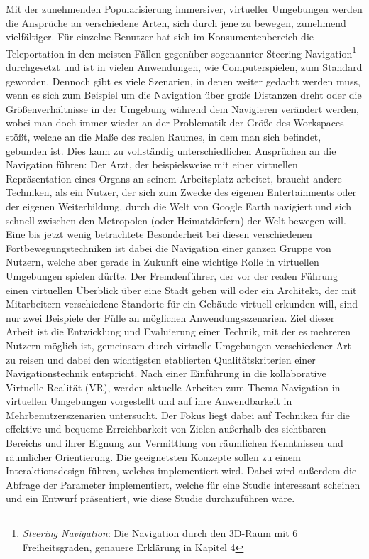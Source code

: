 Mit der zunehmenden Popularisierung immersiver, virtueller Umgebungen werden die Ansprüche an verschiedene Arten, sich durch jene zu bewegen, zunehmend vielfältiger.
Für einzelne Benutzer hat sich im Konsumentenbereich die Teleportation in den meisten Fällen gegenüber sogenannter \glqq Steering Navigation\grqq{}\footnote{\textit{Steering Navigation}: Die Navigation durch den 3D-Raum mit 6 Freiheitsgraden, genauere Erklärung in Kapitel 4} durchgesetzt und ist in vielen Anwendungen, wie Computerspielen, zum Standard geworden. 
Dennoch gibt es viele Szenarien, in denen weiter gedacht werden muss, wenn es sich zum Beispiel um die Navigation über große Distanzen dreht oder die Größenverhältnisse in der Umgebung während dem Navigieren verändert werden, wobei man doch immer wieder an der Problematik der Größe des Workspaces stößt, welche an die Maße des realen Raumes, in dem man sich befindet, gebunden ist.
Dies kann zu vollständig unterschiedlichen Ansprüchen an die Navigation führen: Der Arzt, der  beispielsweise mit einer virtuellen Repräsentation eines Organs an seinem Arbeitsplatz arbeitet, braucht andere Techniken, als ein Nutzer, der sich zum Zwecke des eigenen Entertainments oder der eigenen Weiterbildung, durch die Welt von Google Earth navigiert und sich schnell zwischen den Metropolen (oder Heimatdörfern) der Welt bewegen will. Eine bis jetzt wenig betrachtete Besonderheit bei diesen verschiedenen Fortbewegungstechniken ist dabei die Navigation einer ganzen Gruppe von Nutzern, welche aber gerade in Zukunft eine wichtige Rolle in virtuellen Umgebungen spielen dürfte. Der Fremdenführer, der vor der \glqq realen\grqq{} Führung einen virtuellen Überblick über eine Stadt geben will oder ein Architekt, der mit Mitarbeitern verschiedene Standorte für ein Gebäude virtuell erkunden will, sind nur zwei Beispiele der Fülle an möglichen Anwendungsszenarien.
Ziel dieser Arbeit ist die Entwicklung und Evaluierung einer Technik, mit der es mehreren Nutzern möglich ist, gemeinsam durch virtuelle Umgebungen verschiedener Art zu reisen und dabei den wichtigsten etablierten Qualitätskriterien einer Navigationstechnik entspricht. Nach einer Einführung in die kollaborative Virtuelle Realität (VR), werden aktuelle Arbeiten zum Thema \glqq Navigation in virtuellen Umgebungen\grqq{} vorgestellt und auf ihre Anwendbarkeit in Mehrbenutzerszenarien untersucht.
Der Fokus liegt dabei auf Techniken für die effektive und bequeme Erreichbarkeit von Zielen außerhalb des sichtbaren Bereichs und ihrer Eignung zur Vermittlung von räumlichen Kenntnissen und räumlicher Orientierung. 
Die geeignetsten Konzepte sollen zu einem Interaktionsdesign führen, welches implementiert wird. Dabei wird außerdem die Abfrage der Parameter implementiert, welche für eine Studie interessant scheinen und ein Entwurf präsentiert, wie diese Studie durchzuführen wäre.

